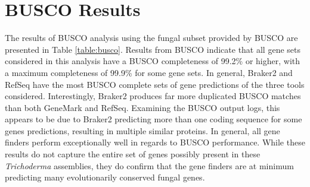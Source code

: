 \section{BUSCO Results}
\label{section:busco}

The results of BUSCO analysis using the fungal subset provided by
BUSCO are presented in Table \ref{table:busco}. Results from BUSCO
indicate that all gene sets considered in this analysis have a BUSCO
completeness of 99.2\% or higher, with a maximum completeness of
99.9\% for some gene sets. In general, Braker2 and RefSeq have the
most BUSCO complete sets of gene predictions of the three tools
considered. Interestingly, Braker2 produces far more duplicated BUSCO
matches than both GeneMark and RefSeq. Examining the BUSCO output
logs, this appears to be due to Braker2 predicting more than one
coding sequence for some genes predictions, resulting in multiple
similar proteins. In general, all gene finders perform exceptionally
well in regards to BUSCO performance. While these results do not
capture the entire set of genes possibly present in these
\textit{Trichoderma} assemblies, they do confirm that the gene finders
are at minimum predicting many evolutionarily conserved fungal genes.

